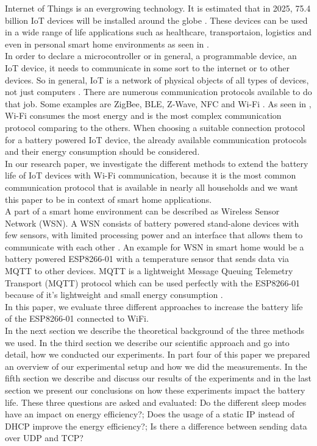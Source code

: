 Internet of Things is an evergrowing technology. It is estimated that in 2025, 75.4 billion IoT devices will be installed around the globe \cite{lucero2016iot}. These devices can be used in a wide range of life applications such as healthcare, transportaion, logistics and even in personal smart home environments as seen in \cite{6803174}.\\  
In order to declare a microcontroller or in general, a programmable device, an IoT device, it needs to communicate in some sort to the internet or to other devices. So in general, IoT is a network of physical objects of all types of devices, not just computers \cite{patel2016internet}. There are numerous communication protocols available to do that job. Some examples are ZigBee, BLE, Z-Wave, NFC and Wi-Fi \cite{8079928}. As seen in \cite{8088226}, Wi-Fi consumes the most energy and is the most complex communication protocol comparing to the others.  
When choosing a suitable connection protocol for a battery powered IoT device, the already available communication protocols and their energy consumption should be considered.\\
In our research paper, we investigate the different methods to extend the battery life of IoT devices with Wi-Fi communication, because it is the most common communication protocol that is available in nearly all households and we want this paper to be in context of smart home applications.\\
A part of a smart home environment can be described as Wireless Sensor Network (WSN). A WSN consists of battery powered stand-alone devices with few sensors, with limited processing power and an interface that allows them to communicate with each other \cite{wsn}. 
An example for WSN in smart home would be a battery powered ESP8266-01 with a temperature sensor that sends data via MQTT to other devices.
MQTT is a lightweight Message Queuing Telemetry Transport (MQTT) protocol which can be used perfectly with the ESP8266-01 because of it's lightweight and small energy consumption \cite{kodali_mqtt_2016}.\\
In this paper, we evaluate three different approaches to increase the battery life of the ESP8266-01 connected to WiFi.\\
In the next section we describe the theoretical background of the three methods we used. 
In the third section we describe our scientific approach and go into detail, how we conducted our experiments.
In part four of this paper we prepared an overview of our experimental setup and how we did the measurements.
In the fifth section we describe and discuss our results of the experiments and in the last section we present our conclusions on how these experiments impact the battery life.
These three questions are asked and evaluated: Do the different sleep modes have an impact on energy efficiency?; Does the usage of a static IP instead of DHCP improve the energy efficiency?; Is there a difference between sending data over UDP and TCP?
